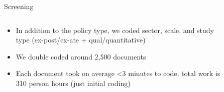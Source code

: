 \documentclass[9pt]{beamer}
\begin{document}
\begin{frame}{Screening}
\begin{columns}
	\begin{column}{0.382\linewidth}
		\begin{itemize}
			\item<1-> In addition to the policy type, we coded sector, scale, and study type (ex-post/ex-ate + qual/quantitative)
			\item<2-> We double coded around 2,500 documents
			\item<3-> Each document took on average <3 minutes to code, total work is 310 person hours (just initial coding)
		\end{itemize}
	\end{column}
	\begin{column}{0.618\linewidth}
		\begin{figure}
		\end{figure}
	\end{column}

\end{columns}
\end{frame}
\end{document}
